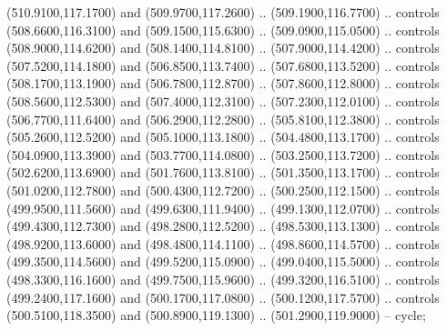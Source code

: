 {\begin{scope}[y=0.80pt, x=0.80pt, yscale=-1, xscale=1, inner sep=0pt, outer sep=0pt, #1]
      (510.9100,117.1700) and (509.9700,117.2600) .. (509.1900,116.7700) .. controls
      (508.6600,116.3100) and (509.1500,115.6300) .. (509.0900,115.0500) .. controls
      (508.9000,114.6200) and (508.1400,114.8100) .. (507.9000,114.4200) .. controls
      (507.5200,114.1800) and (506.8500,113.7400) .. (507.6800,113.5200) .. controls
      (508.1700,113.1900) and (506.7800,112.8700) .. (507.8600,112.8000) .. controls
      (508.5600,112.5300) and (507.4000,112.3100) .. (507.2300,112.0100) .. controls
      (506.7700,111.6400) and (506.2900,112.2800) .. (505.8100,112.3800) .. controls
      (505.2600,112.5200) and (505.1000,113.1800) .. (504.4800,113.1700) .. controls
      (504.0900,113.3900) and (503.7700,114.0800) .. (503.2500,113.7200) .. controls
      (502.6200,113.6900) and (501.7600,113.8100) .. (501.3500,113.1700) .. controls
      (501.0200,112.7800) and (500.4300,112.7200) .. (500.2500,112.1500) .. controls
      (499.9500,111.5600) and (499.6300,111.9400) .. (499.1300,112.0700) .. controls
      (499.4300,112.7300) and (498.2800,112.5200) .. (498.5300,113.1300) .. controls
      (498.9200,113.6000) and (498.4800,114.1100) .. (498.8600,114.5700) .. controls
      (499.3500,114.5600) and (499.5200,115.0900) .. (499.0400,115.5000) .. controls
      (498.3300,116.1600) and (499.7500,115.9600) .. (499.3200,116.5100) .. controls
      (499.2400,117.1600) and (500.1700,117.0800) .. (500.1200,117.5700) .. controls
      (500.5100,118.3500) and (500.8900,119.1300) .. (501.2900,119.9000) -- cycle;


\end{scope}}
